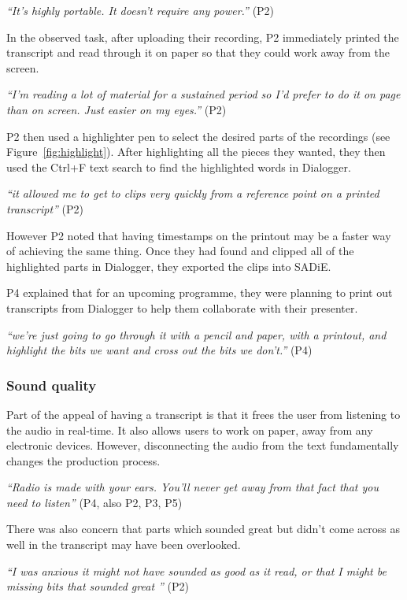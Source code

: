 \textit{``It's highly portable. It doesn't require any power.''} (P2)

In the observed task, after uploading their recording, P2 immediately printed
the transcript and read through it on paper so that they could work away from
the screen.

\textit{``I'm reading a lot of material for a sustained period so I'd prefer to do it on page than on screen. Just
  easier on my eyes.''} (P2)


P2 then used a highlighter pen to select the desired parts of the recordings (see Figure~\ref{fig:highlight}).  After
highlighting all the pieces they wanted,
they then used the Ctrl+F text search to find the highlighted words in Dialogger.

\textit{``it allowed me to get to clips very quickly from a reference point on a printed transcript''} (P2)

However P2 noted that having timestamps on the printout may be a faster
way of achieving the same thing.
Once they had found and clipped all of the highlighted parts in Dialogger, they exported the clips into SADiE.

P4 explained that for an upcoming programme, they were
planning to print out transcripts from Dialogger to help
them collaborate with their presenter.

\textit{``we're just going to go through it with a pencil and paper, with a
  printout, and highlight the bits we want and cross out the bits we don't.''}
(P4)

\subsubsection{Sound quality}
Part of the appeal of having a transcript is that it frees the user from listening to the audio in real-time. It also
allows users to work on paper, away from any electronic devices. However, disconnecting the audio from the text
fundamentally changes the production process.

\textit{``Radio is made with your ears. You'll never get away from that fact that you need to listen''} (P4, also P2,
P3, P5)

There was also concern that parts which sounded great but didn't come across as well in the transcript may have been
overlooked.

\textit{``I was anxious it might not have sounded as good as it read, or that I might be missing bits that sounded
  great ''} (P2)

